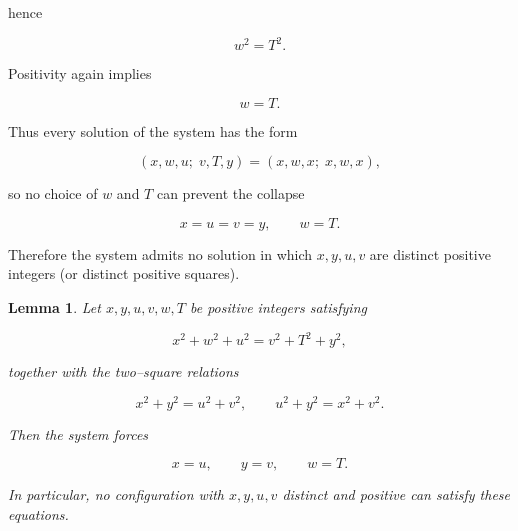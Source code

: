 \documentclass[12pt]{article}
\newtheorem{lemma}{Lemma}
\begin{document}
hence


\[
w^{2} = T^{2}.
\]



Positivity again implies


\[
w = T.
\]



Thus every solution of the system has the form


\[
(x,w,u;\;v,T,y) = (x,w,x;\;x,w,x),
\]


so no choice of $w$ and $T$ can prevent the collapse


\[
x = u = v = y, \qquad w = T.
\]



Therefore the system admits no solution in which
$x,y,u,v$ are distinct positive integers (or distinct positive squares).

\begin{lemma}
Let $x,y,u,v,w,T$ be positive integers satisfying


\[
x^{2}+w^{2}+u^{2}=v^{2}+T^{2}+y^{2},
\]


together with the two--square relations


\[
x^{2}+y^{2}=u^{2}+v^{2},
\qquad
u^{2}+y^{2}=x^{2}+v^{2}.
\]


Then the system forces


\[
x=u,\qquad y=v,\qquad w=T.
\]


In particular, no configuration with $x,y,u,v$ distinct and positive can satisfy these equations.
\end{lemma}
\end{document}
